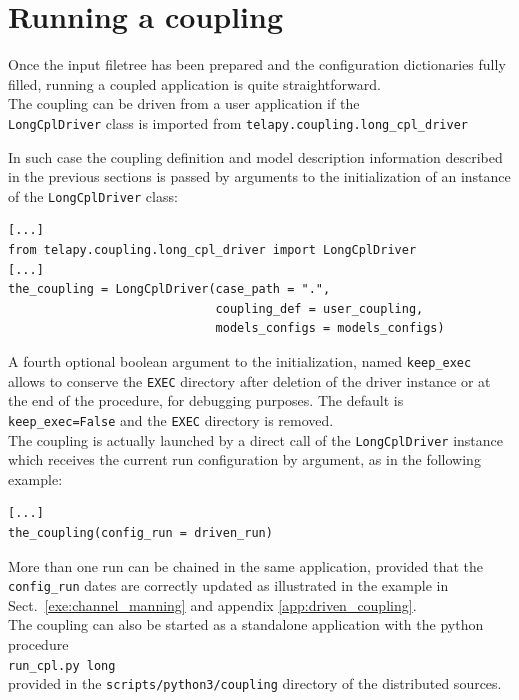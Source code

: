 \documentclass[Coupling]{../../data/TelemacDoc} %
\begin{document}
\chapter{Running a coupling}\label{running}
Once the input filetree has been prepared and the configuration
dictionaries fully filled, running a coupled application is quite
straightforward.\\

The coupling can be driven from a user application if the\\
\texttt{LongCplDriver} class is imported from
\texttt{telapy.coupling.long\_cpl\_driver}

In such case the coupling definition and model description
information described in the previous sections is 
passed by arguments to the initialization of an instance of the
\texttt{LongCplDriver} class:
\begin{verbatim}
[...]
from telapy.coupling.long_cpl_driver import LongCplDriver
[...]
the_coupling = LongCplDriver(case_path = ".", 
                             coupling_def = user_coupling,
                             models_configs = models_configs)
\end{verbatim}
A fourth optional boolean argument to the initialization, named
\texttt{keep\_exec} allows to conserve the \texttt{EXEC} directory after
deletion of the driver instance or at the end of the procedure, for
debugging purposes. The default is \texttt{keep\_exec=False} and the \texttt{EXEC} directory
is removed.\\

The coupling is actually launched by a direct call of the
\texttt{LongCplDriver} instance which receives the current run
configuration by argument, as in the following example:
\begin{verbatim}
[...]
the_coupling(config_run = driven_run)
\end{verbatim}

More than one run can be chained in the same application, provided
that the \texttt{config\_run} dates are correctly updated as
illustrated in the example in Sect.~\ref{exe:channel_manning} and
appendix \ref{app:driven_coupling}.
$~$\\

The coupling can also be started as a standalone application with the
python procedure\\
\texttt{run\_cpl.py long}\\
provided in the \texttt{scripts/python3/coupling} directory of the 
distributed sources.
\newline
\end{document}
